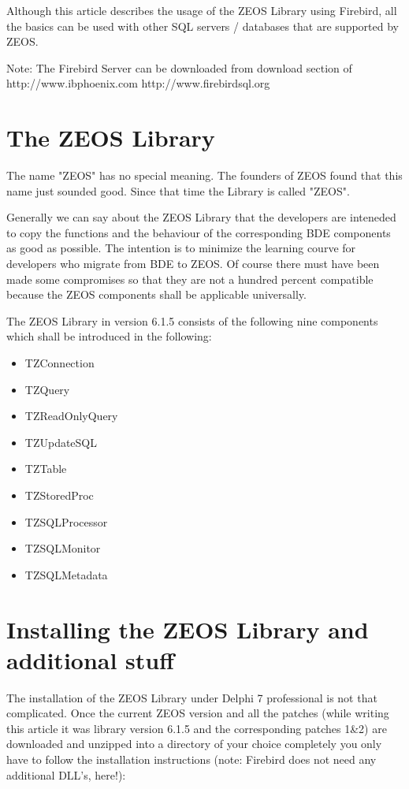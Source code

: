 \documentclass[a4paper,12pt,oneside]{book}
\begin{document}
Although this article describes the usage of the ZEOS Library using Firebird, all the basics can be used with other SQL servers / databases that are supported by ZEOS.

Note: The Firebird Server can be downloaded from download section of
http://www.ibphoenix.com
http://www.firebirdsql.org

\section{The ZEOS Library}
The name "ZEOS" has no special meaning. The founders of ZEOS found that this name just sounded good.
Since that time the Library is called "ZEOS".

Generally we can say about the ZEOS Library that the developers are inteneded to
copy the functions and the behaviour of the corresponding BDE components as good
as possible.
The intention is to minimize the learning courve for developers who
migrate from BDE to ZEOS.
Of course there must have been made some compromises so that they are not a hundred percent compatible because the ZEOS components shall be applicable universally.

The ZEOS Library in version 6.1.5 consists of the following nine components
which shall be introduced in the following:
\begin{itemize}
\item TZConnection
\item TZQuery
\item TZReadOnlyQuery
\item TZUpdateSQL
\item TZTable
\item TZStoredProc
\item TZSQLProcessor
\item TZSQLMonitor
\item TZSQLMetadata
\end{itemize}

\section{Installing the ZEOS Library and additional stuff}

The installation of the ZEOS Library under Delphi 7 professional is not that complicated.
Once the current ZEOS version and all the patches (while writing this article it was library version 6.1.5 and the corresponding patches 1\&2) are downloaded and unzipped into a directory of your choice completely you only have to follow the installation instructions (note: Firebird does not need any additional DLL's, here!):
\end{document}
